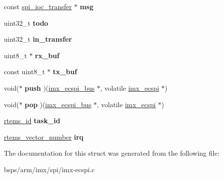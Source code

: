 \begin{DoxyCompactItemize}
const \mbox{\hyperlink{structspi__ioc__transfer}{spi\+\_\+ioc\+\_\+transfer}} $\ast$ {\bfseries msg}
\item 
\mbox{\label{structimx__ecspi__bus_a1c8cc43798d70394bfe7b1dd9b47a496}} 
uint32\+\_\+t {\bfseries todo}
\item 
\mbox{\label{structimx__ecspi__bus_a091d51b0090fa447ff74d57227651249}} 
uint32\+\_\+t {\bfseries in\+\_\+transfer}
\item 
\mbox{\label{structimx__ecspi__bus_af788725735c0bb6e2d6cafeba35497a4}} 
uint8\+\_\+t $\ast$ {\bfseries rx\+\_\+buf}
\item 
\mbox{\label{structimx__ecspi__bus_a0ae055dfec921627ad0c0062703a9644}} 
const uint8\+\_\+t $\ast$ {\bfseries tx\+\_\+buf}
\item 
\mbox{\label{structimx__ecspi__bus_a52b4470ddc836455c14c6d66861bb415}} 
void($\ast$ {\bfseries push} )(\mbox{\hyperlink{structimx__ecspi__bus}{imx\+\_\+ecspi\+\_\+bus}} $\ast$, volatile \mbox{\hyperlink{structimx__ecspi}{imx\+\_\+ecspi}} $\ast$)
\item 
\mbox{\label{structimx__ecspi__bus_a923c025760946e67aadc256eeef948b7}} 
void($\ast$ {\bfseries pop} )(\mbox{\hyperlink{structimx__ecspi__bus}{imx\+\_\+ecspi\+\_\+bus}} $\ast$, volatile \mbox{\hyperlink{structimx__ecspi}{imx\+\_\+ecspi}} $\ast$)
\item 
\mbox{\label{structimx__ecspi__bus_a70d775f7c2cc5e4e455e1d13fa8736c6}} 
\mbox{\hyperlink{group__ClassicTasks_gab20892b814dced7dd4e5b9bf42becd57}{rtems\+\_\+id}} {\bfseries task\+\_\+id}
\item 
\mbox{\label{structimx__ecspi__bus_a23ce25ed3436f1e737a4130be1f85d18}} 
\mbox{\hyperlink{group__ClassicINTR_ga3e434c197d99f128e78cae4d9358bd8b}{rtems\+\_\+vector\+\_\+number}} {\bfseries irq}
\end{DoxyCompactItemize}


The documentation for this struct was generated from the following file\+:\begin{DoxyCompactItemize}
\item 
bsps/arm/imx/spi/imx-\/ecspi.\+c\end{DoxyCompactItemize}

